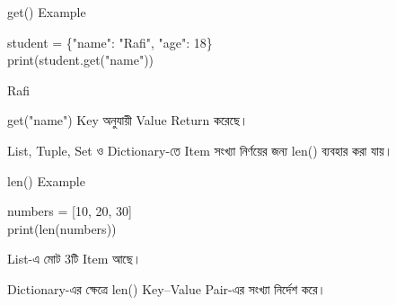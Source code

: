 \begin{codeoutputbox}{\textenglish{\ttfamily get()} Example}

\noindent
\begin{minipage}[t]{0.55\linewidth}
\codeheading

\begin{english}
\ttfamily
student = \{"name": "Rafi", "age": 18\}\\
print(student.get("name"))
\end{english}

\end{minipage}
\hfill
\begin{minipage}[t]{0.41\linewidth}
\outputheading

\begin{center}
\textenglish{\ttfamily Rafi}
\end{center}

\textenglish{\ttfamily get("name")}
Key অনুযায়ী Value Return করেছে।

\end{minipage}

\end{codeoutputbox}



List, Tuple, Set ও Dictionary-তে Item সংখ্যা নির্ণয়ের জন্য
\textenglish{\ttfamily len()}
ব্যবহার করা যায়।

\begin{codeoutputbox}{\textenglish{\ttfamily len()} Example}

\noindent
\begin{minipage}[t]{0.53\linewidth}
\codeheading

\begin{english}
\ttfamily
numbers = [10, 20, 30]\\
print(len(numbers))
\end{english}

\end{minipage}
\hfill
\begin{minipage}[t]{0.43\linewidth}
\outputheading

\begin{center}
\textenglish{}
\end{center}

List-এ মোট 3টি Item আছে।

Dictionary-এর ক্ষেত্রে
\textenglish{\ttfamily len()}
Key--Value Pair-এর সংখ্যা নির্দেশ করে।

\end{minipage}

\end{codeoutputbox}


